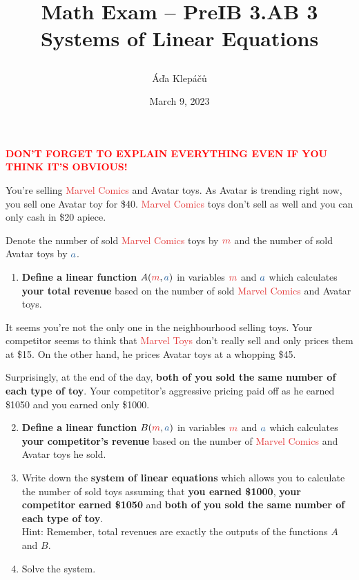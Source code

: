 \documentclass[a4paper,12pt]{article}
\title{\Huge\textsf{Math Exam -- PreIB 3.AB 3}\\
 \Large\textsf{Systems of Linear Equations}
 \author{Áďa Klepáčů}
 \date{March 9, 2023}
}
\newcommand{\tr}{\textcolor{red}}
\newcommand{\tmar}{\textcolor[HTML]{e23636}}
\newcommand{\tav}{\textcolor[HTML]{2e67a0}}
\begin{document}
\maketitle
\thispagestyle{fancy}

\begin{center}
 \textbf{\tr{DON'T FORGET TO EXPLAIN EVERYTHING EVEN IF YOU THINK IT'S
 OBVIOUS!}}
\end{center}

You're selling \tmar{Marvel Comics} and \tav{Avatar} toys. As \tav{Avatar} is
trending right now, you sell one \tav{Avatar} toy for \$40. \tmar{Marvel Comics}
toys don't sell as well and you can only cash in \$20 apiece.

Denote the number of sold \tmar{Marvel Comics} toys by $\tmar{m}$ and the number
of sold \tav{Avatar} toys by $\tav{a}$.

\begin{enumerate}[topsep=0pt,label=(\alph*)]
 \item \textbf{Define a linear function} $A(\tmar{m},\tav{a})$ in variables
  $\tmar{m}$ and $\tav{a}$ which calculates \textbf{your total revenue} based on
  the number of sold \tmar{Marvel Comics} and \tav{Avatar} toys.
\end{enumerate}

\newpage

It seems you're not the only one in the neighbourhood selling toys. Your
competitor seems to think that \tmar{Marvel Toys} don't really sell and only
prices them at \$15. On the other hand, he prices \tav{Avatar} toys at a
whopping \$45.

Surprisingly, at the end of the day, \textbf{both of you sold the same number of
each type of toy}. Your competitor's aggressive pricing paid off as he earned
\$1050 and you earned only \$1000.

\begin{enumerate}[label=(\alph*),topsep=0pt]
 \setcounter{enumi}{1}
 \item \textbf{Define a linear function} $B(\tmar{m},\tav{a})$ in variables
  $\tmar{m}$ and $\tav{a}$ which calculates \textbf{your competitor's revenue}
  based on the number of \tmar{Marvel Comics} and \tav{Avatar} toys he sold.
 \item Write down the \textbf{system of linear equations} which allows you to
  calculate the number of sold toys assuming that \textbf{you earned \$1000},
  \textbf{your competitor earned \$1050} and \textbf{both of you sold the same
  number of each type of toy}.\\
  Hint: Remember, total revenues are exactly the outputs of the functions $A$ 
  and $B$.
 \item Solve the system.
\end{enumerate}
\end{document}
